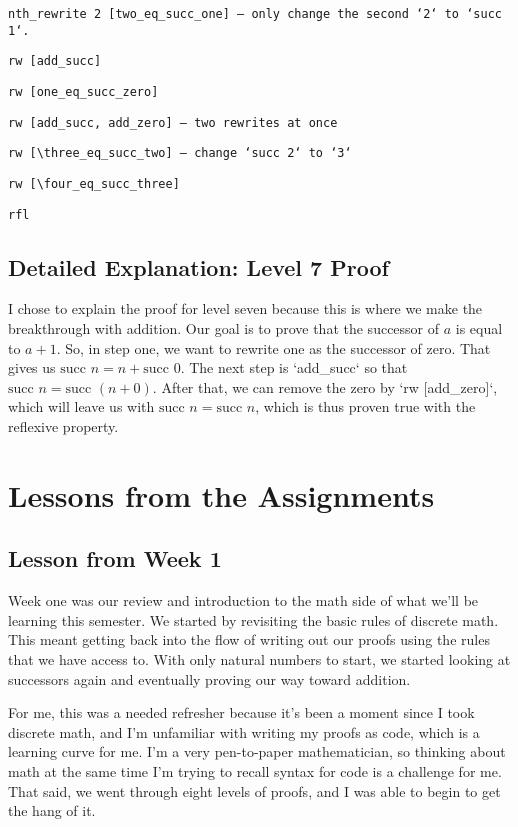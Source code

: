 \documentclass{article}
\begin{document}
\texttt{nth\_rewrite 2 [two\_eq\_succ\_one] -- only change the second `2` to `succ 1`.}

\texttt{rw [add\_succ]}

\texttt{rw [one\_eq\_succ\_zero]}

\texttt{rw [add\_succ, add\_zero] -- two rewrites at once}

\texttt{rw [\textbackslash three\_eq\_succ\_two] -- change `succ 2` to `3`}

\texttt{rw [\textbackslash four\_eq\_succ\_three]}

\texttt{rfl}

\subsection*{Detailed Explanation: Level 7 Proof}
I chose to explain the proof for level seven because this is where we make the breakthrough with addition. Our goal is to prove that the successor of \(a\) is equal to \(a + 1\). So, in step one, we want to rewrite one as the successor of zero. That gives us \(\text{succ } n = n + \text{succ } 0\). The next step is `add\_succ` so that \(\text{succ } n = \text{succ } (n + 0)\). After that, we can remove the zero by `rw [add\_zero]`, which will leave us with \(\text{succ } n = \text{succ } n\), which is thus proven true with the reflexive property.

\section*{Lessons from the Assignments}
\subsection*{Lesson from Week 1}
Week one was our review and introduction to the math side of what we'll be learning this semester. We started by revisiting the basic rules of discrete math. This meant getting back into the flow of writing out our proofs using the rules that we have access to. With only natural numbers to start, we started looking at successors again and eventually proving our way toward addition.

For me, this was a needed refresher because it's been a moment since I took discrete math, and I'm unfamiliar with writing my proofs as code, which is a learning curve for me. I'm a very pen-to-paper mathematician, so thinking about math at the same time I'm trying to recall syntax for code is a challenge for me. That said, we went through eight levels of proofs, and I was able to begin to get the hang of it.
\end{document}
